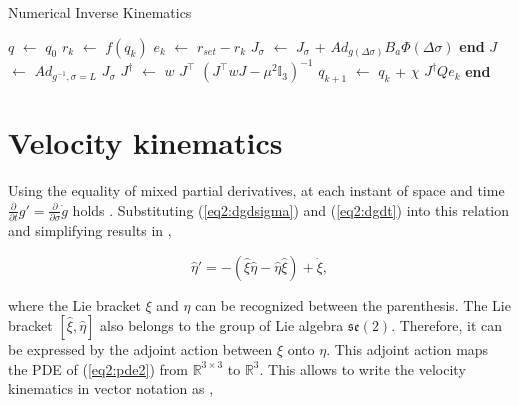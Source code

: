 \begin{algorithm}[H]
\caption{Numerical Inverse Kinematics}
\begin{algorithmic}[1]
\State $q$ $\leftarrow$ $q_0$ 
      
    \State $r_k$ $\leftarrow$ $f(q_k)$  
     \State $e_k$ $\leftarrow$ $r_{set} - r_{k}$ 
            \State $J_{\sigma}$ $\leftarrow$  $J_{\sigma}$ + $Ad_{g(\Delta \sigma)} B_a \Phi(\Delta \sigma)$ 
        \EndFor
    \State \textbf{end}
    \State $J$ $\leftarrow$ $Ad_{g^{-1},\sigma=L}$ $J_{\sigma}$ 
    \State $J^{\dagger}$ $\leftarrow$  $w$ $J^{\top}$ $(J^\top w J - \mu^2 \mathbb{I}_3)^{-1}$ 
    \State $q_{k+1}$  $\leftarrow$ $q_{k}$ + $\chi$ $J^{\dagger} Q e_k$ 
\EndWhile 
\State \textbf{end}
    \label{alg2:numericalinverse}
\end{algorithmic}
\end{algorithm}


\section{Velocity kinematics}


Using the equality of mixed partial derivatives, at each instant of space and time $\frac{\partial}{\partial t}g' = \frac{\partial}{\partial \sigma}\dot{g}$ holds \cite{Caasenbrood2020}. Substituting (\ref{eq2:dgdsigma}) and (\ref{eq2:dgdt}) into this relation and simplifying results in \cite{Caasenbrood2020},

\begin{equation}
    \hat{\eta}' = -(\hat{\xi}\hat{\eta} - \hat{\eta}\hat{\xi}) + \Dot{\xi},
        \label{eq2:pde2}
\end{equation}

where the Lie bracket $\xi$ and $\eta$ can be recognized between the parenthesis. The Lie bracket $[\hat{\xi},\hat{\eta}]$ also belongs to the group of Lie algebra $\mathfrak{se}(2)$. Therefore, it can be expressed by the adjoint action between $\xi$ onto $\eta$. This adjoint action maps the PDE of (\ref{eq2:pde2}) from $\mathbb{R}^{3\times 3}$ to $\mathbb{R}^3$. This allows to write the velocity kinematics in vector notation as \cite{Caasenbrood2020},

